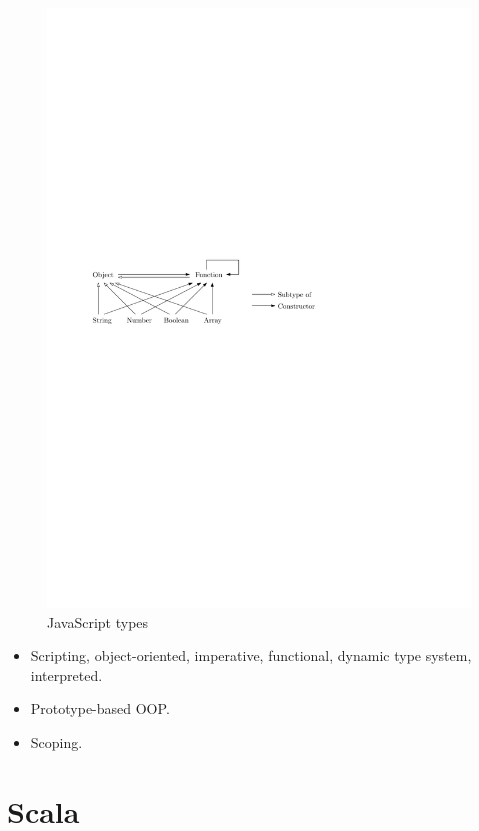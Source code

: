 \documentclass[12pt,a4paper]{report}
\begin{document}
\begin{figure}[h]
  \centering
		\includegraphics{img/javascript-types.pdf}
	\caption{JavaScript types}
\end{figure}

\begin{itemize}
\item Scripting, object-oriented, imperative, functional, dynamic type system, interpreted. 
\item Prototype-based OOP.
\item Scoping.
\end{itemize}

\section{Scala}
\end{document}
